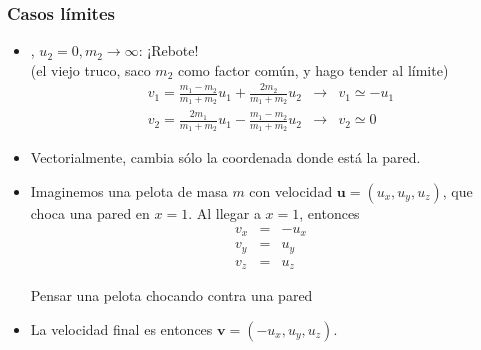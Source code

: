 \documentclass[xetex,mathserif,serif,10pt]{beamer}
\newcommand{\bblock}[1]{{\color{chart12}{#1}}}
\newcommand{\mb}[1]{\mathbf{#1}}
\begin{document}
\begin{frame}
\frametitle{Casos límites}
\begin{itemize}
\item \bblock{Choque contra una pared}, $u_2=0, m_2\to\infty$: \alert{¡Rebote!}
\\
{\tiny{(el viejo truco, saco $m_2$ como factor común, y hago tender al límite)}}
\begin{eqnarray*}
    v_1 = \frac{m_1 - m_2}{m_1 + m_2} u_1 + \frac{2 m_2}{m_1+m_2} u_2 &\to& v_1 \simeq - u_1 \\
    v_2 = \frac{2 m_1}{m_1+m_2} u_1 - \frac{m_1-m_2}{m_1+m_2} u_2 &\to& v_2 \simeq 0
\end{eqnarray*}
\vspace{-1em}
\item Vectorialmente, cambia sólo la coordenada donde está la pared.
\item Imaginemos una pelota de masa $m$ con velocidad $\mb{u}=(u_x,u_y,u_z)$, que choca una pared en $x=1$. Al llegar a $x=1$, entonces
\begin{eqnarray*}
    v_x &=& - u_x \\
    v_y &=&  u_y \\
    v_z &=&  u_z 
\end{eqnarray*}
\begin{center}\alert{Pensar una pelota chocando contra una pared}\end{center}
\item La velocidad final es entonces $\mb{v}=(-u_x,u_y,u_z)$.
\end{itemize}

\end{frame}
\end{document}
